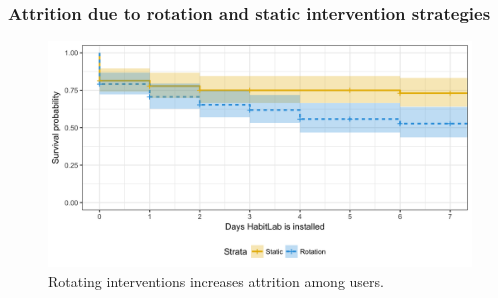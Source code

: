 




\subsubsection{Attrition due to rotation and static intervention strategies}

\begin{figure}
\centering
	\includegraphics[width=1.0\textwidth]{figures/attrition_within_subjects.png}
	\caption{Rotating interventions increases attrition among users.}
\label{fig:attrition_within_subjects}
\end{figure}

